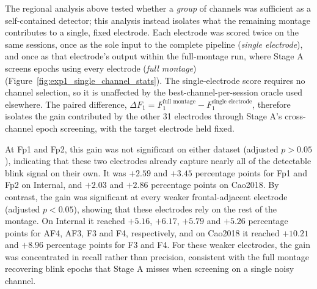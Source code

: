 The regional analysis above tested whether a \emph{group} of channels was sufficient as a self-contained detector; this analysis instead isolates what the remaining montage contributes to a single, fixed electrode. Each electrode was scored twice on the same sessions, once as the sole input to the complete pipeline (\emph{single electrode}), and once as that electrode's output within the full-montage run, where Stage A screens epochs using every electrode (\emph{full montage}) (Figure~\ref{fig:exp1_single_channel_stats}). The single-electrode score requires no channel selection, so it is unaffected by the best-channel-per-session oracle used elsewhere. The paired difference, $\Delta F_1 = F_1^{\text{full montage}} - F_1^{\text{single electrode}}$, therefore isolates the gain contributed by the other 31 electrodes through Stage A's cross-channel epoch screening, with the target electrode held fixed.

At Fp1 and Fp2, this gain was not significant on either dataset (adjusted $p > 0.05$), indicating that these two electrodes already capture nearly all of the detectable blink signal on their own. It was $+2.59$ and $+3.45$ percentage points for Fp1 and Fp2 on Internal, and $+2.03$ and $+2.86$ percentage points on Cao2018. By contrast, the gain was significant at every weaker frontal-adjacent electrode (adjusted $p < 0.05$), showing that these electrodes rely on the rest of the montage. On Internal it reached $+5.16$, $+6.17$, $+5.79$ and $+5.26$ percentage points for AF4, AF3, F3 and F4, respectively, and on Cao2018 it reached $+10.21$ and $+8.96$ percentage points for F3 and F4. For these weaker electrodes, the gain was concentrated in recall rather than precision, consistent with the full montage recovering blink epochs that Stage A misses when screening on a single noisy channel.
